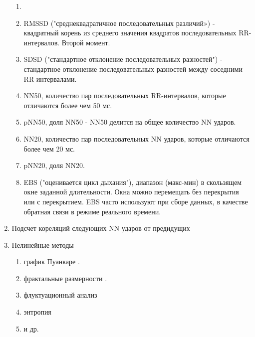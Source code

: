 \begin{enumerate}
	\begin{enumerate}
		\item 
		\item 	RMSSD ("среднеквадратичное последовательных различий») - квадратный корень из среднего значения квадратов последовательных RR-интервалов. Второй момент.
		\item SDSD ("стандартное отклонение последовательных разностей") - стандартное отклонение последовательных разностей между соседними  RR-интервалами.
		\item NN50, количество пар последовательных RR-интервалов, которые отличаются более чем 50 мс.
		\item pNN50, доля NN50 - NN50 делится на общее количество NN ударов.
		\item 	NN20, количество пар последовательных NN ударов, которые отличаются более чем 20 мс.
		\item pNN20, доля NN20.
		\item EBS ("оценивается цикл дыхания"), диапазон (макс-мин) в скользящем окне заданной длительности. Окна можно перемещать без перекрытия или с перекрытием. EBS часто используют при сборе данных, в качестве обратная связи в режиме реального времени.
	\end{enumerate}
	
	\item Подсчет кореляций следующих NN ударов от предидущих \cite{autocorr_metric}
	\item Нелинейные методы \cite{non_linear_metric}
	
	\begin{enumerate}
		\item график Пуанкаре \cite{poinkare_plot}.
		\item фрактальные размерности \cite{fractal_dim}.
		\item флуктуационный анализ \cite{fluct_analis}
		\item энтропия \cite{entropy1, entropy2, entropy3}
		\item и др. \cite{other_analis1, other_analis2, other_analis3}
	\end{enumerate}	
\end{enumerate}

